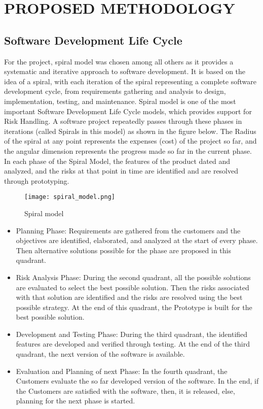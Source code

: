 \newpage

\section{PROPOSED METHODOLOGY}
\subsection{Software Development Life Cycle}
For the project, spiral model was chosen among all others as it provides a systematic and iterative approach to software development. It is based on the idea of a spiral, with each iteration of the spiral representing a complete software development cycle, from requirements gathering and analysis to design, implementation, testing, and maintenance. Spiral model is one of the most important Software Development Life Cycle models, which provides support for Risk Handling. A software project repeatedly passes through these phases in iterations (called Spirals in this model) as shown in the figure below. The Radius of the spiral at any point represents the expenses (cost) of the project so far, and the angular dimension represents the progress made so far in the current phase. In each phase
of the Spiral Model, the features of the product dated and analyzed, and the risks at that point in time are identified and are resolved through prototyping.

\begin{figure}[h]
    \centering
    \texttt{[image: spiral\_model.png]}
    \caption{Spiral model}
    \label{Figure 1: Spiral Model}
\end{figure}

\begin{itemize}
    \item Planning Phase:
    Requirements are gathered from the customers and the objectives are
identified, elaborated, and analyzed at the start of every phase. Then
alternative solutions possible for the phase are proposed in this quadrant.

    \item Risk Analysis Phase:
    During the second quadrant, all the possible solutions are evaluated to
select the best possible solution. Then the risks associated with that
solution are identified and the risks are resolved using the best possible
strategy. At the end of this quadrant, the Prototype is built for the best
possible solution.

    \item Development and Testing Phase:
    During the third quadrant, the identified features are developed and
verified through testing. At the end of the third quadrant, the next version
of the software is available.

    \item Evaluation and Planning of next Phase:
    In the fourth quadrant, the Customers evaluate the so far developed version of the software. In the end, if the Customers are satisfied with the software, then, it is released, else, planning for the next phase is started.

\end{itemize}

